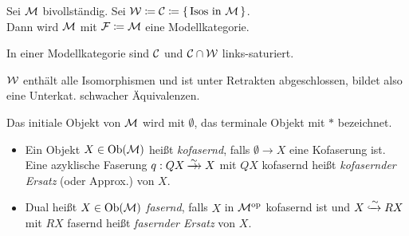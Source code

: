 \documentclass{cheat-sheet}
\newcommand{\nspace}[1]{\foreach \i in {1,...,#1}{ \! }} %
\newcommand{\xtwoheadrightarrow}[1]{\xrightarrow{#1}\nspace{8}\to\,\,} %
\newenvironment{centertikzcd}
  {\begin{center}\begin{tikzcd}}
  {\end{tikzcd}\end{center}}
\begin{document}
\begin{bsp}
  Sei $\mathcal{M}$ bivollständig. Sei $\mathcal{W} \coloneqq \mathcal{C} \coloneqq \{ \, \text{Isos in $\mathcal{M}$} \, \}$. \\
  Dann wird $\mathcal{M}$ mit $\mathcal{F} \coloneqq \mathcal{M}$ eine Modellkategorie.
\end{bsp}

\begin{prop}
  In einer Modellkategorie sind $\mathcal{C}$ und $\mathcal{C} \cap \mathcal{W}$ links-saturiert.
\end{prop}

\begin{lem}
  $\mathcal{W}$ enthält alle Isomorphismen und ist unter Retrakten abgeschlossen, bildet also eine Unterkat. schwacher Äquivalenzen.
\end{lem}

\begin{nota}
  Das initiale Objekt von $\mathcal{M}$ wird mit $\emptyset$, das terminale Objekt mit $*$ bezeichnet.
\end{nota}

\begin{defn}
  \begin{itemize}
    \item Ein Objekt $X \in \operatorname{Ob}(\mathcal{M})$ heißt \emph{kofasernd}, falls $\emptyset \to X$ eine Kofaserung ist.
    Eine azyklische Faserung $q : QX \xtwoheadrightarrow{{\sim}} X$ mit $QX$ kofasernd heißt \emph{kofasernder Ersatz} (oder Approx.) von $X$. \\
    \item Dual heißt $X \in \operatorname{Ob}(\mathcal{M})$ \emph{fasernd}, falls $X$ in $\mathcal{M}^{\mathrm{op}}$ kofasernd ist und $X \xhookrightarrow{{\sim}} RX$ mit $RX$ fasernd heißt \emph{fasernder Ersatz} von $X$.
  \end{itemize}
\end{defn}

\end{document}
